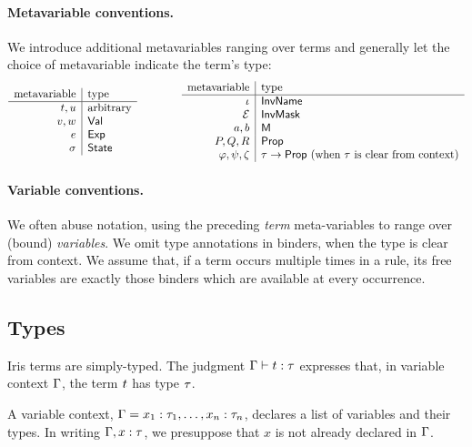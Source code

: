 \paragraph{Metavariable conventions.}
We introduce additional metavariables ranging over terms and generally let the choice of metavariable indicate the term's type:
\[
\begin{array}{r|l}
 \text{metavariable} & \text{type} \\\hline
  t, u & \text{arbitrary} \\
  v, w & \textsf{Val} \\
  e & \textsf{Exp} \\
  \sigma & \textsf{State} \\
\end{array}
\qquad\qquad
\begin{array}{r|l}
 \text{metavariable} & \text{type} \\\hline
  \iota & \textsf{InvName} \\
  \mathcal{E} & \textsf{InvMask} \\
  a, b & \textsf{M} \\
  P, Q, R & \textsf{Prop} \\
  \varphi, \psi, \zeta & \tau\to\textsf{Prop} \text{ (when $\tau$ is clear from context)} \\
\end{array}
\]

\paragraph{Variable conventions.}
We often abuse notation, using the preceding \emph{term} meta-variables to range over (bound) \emph{variables}.
We omit type annotations in binders, when the type is clear from context.
We assume that, if a term occurs multiple times in a rule, its free variables are exactly those binders which are available at every occurrence.


\subsection{Types}\label{sec:types}

Iris terms are simply-typed.
The judgment $\Gamma \vdash t : \tau$ expresses that, in variable context $\Gamma$, the term $t$ has type $\tau$.

A variable context, $\Gamma = x_1:\tau_1, \dots, x_n:\tau_n$, declares a list of variables and their types.
In writing $\Gamma, x:\tau$, we presuppose that $x$ is not already declared in $\Gamma$.

